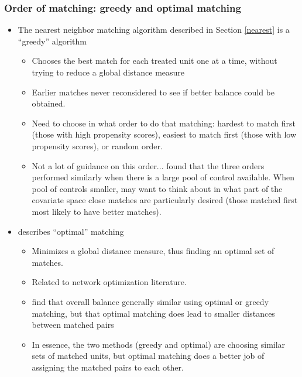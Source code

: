 \documentclass[11pt,titlepage]{article}
\begin{document}
\subsubsection{Order of matching: greedy and optimal matching}
\begin{itemize}
\item The nearest neighbor matching algorithm described in Section \ref{nearest} is a ``greedy'' algorithm
\begin{itemize} \item Chooses the best match for each treated unit one at a time, without trying to reduce a global distance measure
		\item Earlier matches never reconsidered to see if better balance could be obtained.
		\item Need to choose in what order to do that matching: hardest to match first (those with high propensity scores), easiest to match first
(those with low propensity scores), or random order.  
		\item Not a lot of guidance on this order...\cite{Rubin73a} found that the three orders performed similarly
when there is a large pool of control available.  When pool of controls smaller, may want to think about in what part of the covariate space close matches
are particularly desired (those matched first most likely to have better matches).  
\end{itemize}
\item \cite{Rosenbaum02} describes ``optimal'' matching
\begin{itemize} \item Minimizes a global distance measure, thus finding an optimal set of matches.  
		\item Related to network optimization literature.
		\item \cite{GuRos93} find that overall balance generally similar using optimal or greedy matching, 
but that optimal matching does lead to smaller distances between matched pairs
		\item In essence, the two methods (greedy and optimal) are choosing similar sets of matched units, 
but optimal matching does a better job of assigning the matched pairs to each other.  
\end{itemize}
\end{itemize}
\end{document}
